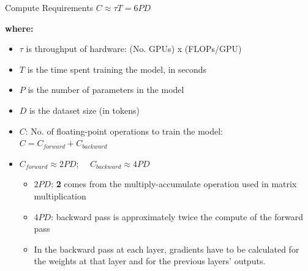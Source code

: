 \documentclass[11pt,compress,t,notes=noshow, xcolor=table]{beamer}
\begin{document}
\begin{vbframe}{Compute Requirements $C \approx \tau T = 6 P D$ }

\textbf{where:}

\begin{itemize}
	\item $\tau$ is throughput of hardware: (No. GPUs) x (FLOPs/GPU)
	\item $T$ is the time spent training the model, in seconds
	\item $P$ is the number of parameters in the model
	\item $D$ is the dataset size (in tokens)
    \item $C$: No. of floating-point operations  to train the model:\\
          $C = C_{forward} + C_{backward}$
	\item $C_{forward} \approx 2 P D$; $\quad C_{backward} \approx 4 P D$
	\begin{itemize}
	    \item $2PD$: \textbf{2} comes from the multiply-accumulate operation used in matrix multiplication
        \item $4PD$: backward pass is approximately twice the compute of the forward pass
    \item In the backward pass at each layer, gradients have to be calculated for the weights at that layer and for the previous layers' outputs.
	\end{itemize}
\end{itemize}

\end{vbframe}

\end{document}
